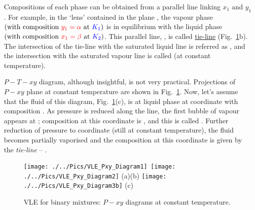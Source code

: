 Compositions of each phase can be obtained from a parallel line linking $x_{1}$ and $y_{1}$. For example, in the `lens'  contained in the plane , the vapour phase $\left(\text{with composition }\textcolor{red}{y_{1}=\alpha}\text{ at } \textcolor{blue}{K_{1}}\right)$ is in equilibrium with the liquid phase $\left(\text{with composition }\textcolor{red}{x_{1}=\beta}\text{ at } \textcolor{blue}{K_{2}}\right)$. This parallel line, , is called \underline{tie-line} (Fig.~\ref{Mod04Fig03}b). The intersection of the tie-line with the saturated liquid line is referred as , and the intersection with the saturated vapour line is called  (at constant temperature).

$P-T-xy$ diagram, although insightful, is not very practical. Projections of $P-xy$ plane at constant temperature are shown in Fig.~\ref{Mod04Fig03}. Now, let's assume that the fluid of this diagram, Fig.~\ref{Mod04Fig03}(c), is at liquid phase at coordinate  with composition . As pressure is reduced along the  line, the first bubble of vapour appears at ; composition at this coordinate is , and this is called . Further reduction of pressure to coordinate  (still at constant temperature), the fluid becomes partially vaporised and the composition at this coordinate is given by the {\it tie-line}  -- . 
      \begin{figure}[h]
        \vbox{\hbox{\hspace{-1.cm}\texttt{[image: ./../Pics/VLE\_Pxy\_Diagram1]}
            \hspace{-4.cm}\texttt{[image: ./../Pics/VLE\_Pxy\_Diagram2]}}
          \vspace{-.5cm}
          \hbox{\hspace{4.5cm}(a)\hspace{7cm}(b)}
          \vspace{-.5cm}\hbox{\hspace{3.cm}\texttt{[image: ./../Pics/VLE\_Pxy\_Diagram3b]}}
          \vspace{-.1cm}
          \hbox{\hspace{7.5cm}(c)}}
             \vspace{-.1cm}\caption{VLE for binary mixtures: $P-xy$ diagrams at constant temperature.}\label{Mod04Fig03}
      \end{figure}
      
